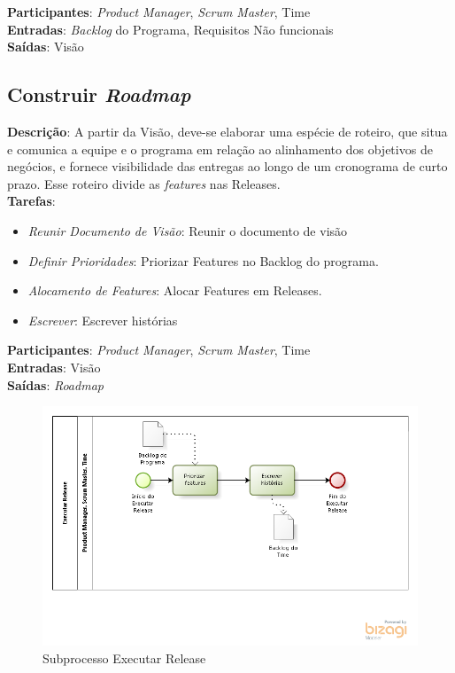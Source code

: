   \textbf{Participantes}: \textit{Product Manager}, \textit{Scrum Master}, Time \\

  \textbf{Entradas}: \textit{Backlog} do Programa, Requisitos Não funcionais \\

  \textbf{Saídas}:  Visão\\

\subsection{Construir \textit{Roadmap}}
  \textbf{Descrição}: A partir da Visão, deve-se elaborar uma espécie de roteiro, que situa e comunica a equipe e o programa em relação ao
  alinhamento dos objetivos de negócios, e fornece visibilidade das entregas ao longo de um cronograma de curto prazo.
  Esse roteiro divide as \textit{features} nas Releases. \\

  \textbf{Tarefas}:
  \begin{itemize}
   \item \indent \textit{Reunir Documento de Visão}: Reunir o documento de visão

   \item \indent \textit{Definir Prioridades}: Priorizar Features no Backlog do programa.

   \item \indent \textit{Alocamento de Features}: Alocar Features em Releases.

   \item \indent \textit{Escrever}: Escrever histórias
  \end{itemize}

  \textbf{Participantes}: \textit{Product Manager}, \textit{Scrum Master}, Time \\

  \textbf{Entradas}: Visão \\

  \textbf{Saídas}:  \textit{Roadmap}\\

\begin{figure}[!htb]
\centering
\includegraphics[scale=0.7]{figuras/release.png}
\caption{Subprocesso Executar Release}
\label{fig:release}
\end{figure}

